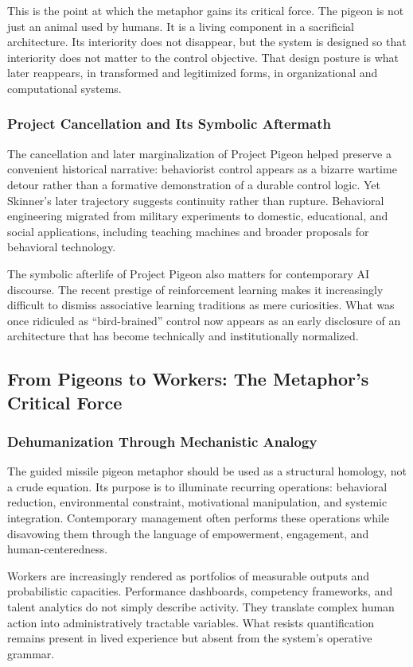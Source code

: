\documentclass[11pt, a4paper]{article}
\begin{document}
This is the point at which the metaphor gains its critical force. The pigeon is not just an animal used by humans. It is a living component in a sacrificial architecture. Its interiority does not disappear, but the system is designed so that interiority does not matter to the control objective. That design posture is what later reappears, in transformed and legitimized forms, in organizational and computational systems.

\subsubsection{Project Cancellation and Its Symbolic Aftermath}
The cancellation and later marginalization of Project Pigeon helped preserve a convenient historical narrative: behaviorist control appears as a bizarre wartime detour rather than a formative demonstration of a durable control logic. Yet Skinner's later trajectory suggests continuity rather than rupture. Behavioral engineering migrated from military experiments to domestic, educational, and social applications, including teaching machines and broader proposals for behavioral technology.

The symbolic afterlife of Project Pigeon also matters for contemporary AI discourse. The recent prestige of reinforcement learning makes it increasingly difficult to dismiss associative learning traditions as mere curiosities. What was once ridiculed as ``bird-brained'' control now appears as an early disclosure of an architecture that has become technically and institutionally normalized.

\subsection{From Pigeons to Workers: The Metaphor's Critical Force}

\subsubsection{Dehumanization Through Mechanistic Analogy}
The guided missile pigeon metaphor should be used as a structural homology, not a crude equation. Its purpose is to illuminate recurring operations: behavioral reduction, environmental constraint, motivational manipulation, and systemic integration. Contemporary management often performs these operations while disavowing them through the language of empowerment, engagement, and human-centeredness.

Workers are increasingly rendered as portfolios of measurable outputs and probabilistic capacities. Performance dashboards, competency frameworks, and talent analytics do not simply describe activity. They translate complex human action into administratively tractable variables. What resists quantification remains present in lived experience but absent from the system's operative grammar.
\end{document}
